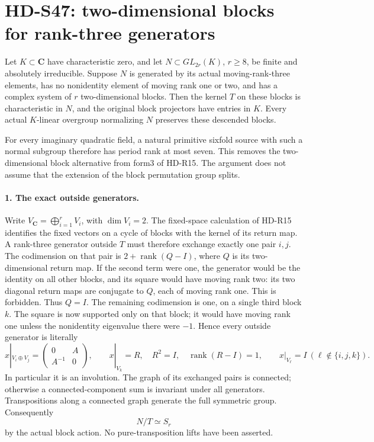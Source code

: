 \section{HD-S47: two-dimensional blocks for rank-three generators}
\label{sec:two-block-rank-three-scope}

Let \(K\subset\mathbf C\) have characteristic zero, and let
\(N\subset GL_{2r}(K)\), \(r\ge8\), be finite and absolutely
irreducible. Suppose \(N\) is generated by its actual moving-rank-three
elements, has no nonidentity element of moving rank one or two,
and has a complex system of \(r\) two-dimensional blocks.
Then the kernel \(T\) on these blocks is characteristic in
\(N\), and the original block projectors have entries in \(K\).
Every actual \(K\)-linear overgroup normalizing \(N\) preserves
these descended blocks.

For every imaginary quadratic field, a natural primitive
sixfold source with such a normal subgroup therefore has
period rank at most seven. This removes the two-dimensional
block alternative from form3 of HD-R15. The argument does not
assume that the extension of the block permutation group splits.

\paragraph{1. The exact outside generators.}
Write \(V_{\mathbf C}=\bigoplus_{i=1}^rV_i\), with
\(\dim V_i=2\). The fixed-space calculation of HD-R15
identifies the fixed vectors on a cycle of blocks with the
kernel of its return map. A rank-three generator outside
\(T\) must therefore exchange exactly one pair \(i,j\).
The codimension on that pair is
\(2+\operatorname{rank}(Q-I)\), where \(Q\) is its
two-dimensional return map. If the second term were one,
the generator would be the identity on all other blocks,
and its square would have moving rank two: its two diagonal
return maps are conjugate to \(Q\), each of moving rank
one. This is forbidden. Thus \(Q=I\). The remaining
codimension is one, on a single third block \(k\). The
square is now supported only on that block; it would have
moving rank one unless the nonidentity eigenvalue there
were \(-1\). Hence every outside generator is literally
\[
 x|_{V_i\oplus V_j}=\begin{pmatrix}0&A\\A^{-1}&0\end{pmatrix},
 \qquad x|_{V_k}=R,\quad R^2=I,\quad\operatorname{rank}(R-I)=1,
 \qquad x|_{V_\ell}=I\ (\ell\notin\{i,j,k\}).
 \tag{S47.1}
\]
In particular it is an involution. The graph of its exchanged
pairs is connected; otherwise a connected-component sum is
invariant under all generators. Transpositions along a connected
graph generate the full symmetric group. Consequently
\[
                           N/T\simeq S_r
 \tag{S47.2}
\]
by the actual block action. No pure-transposition lifts have
been asserted.

